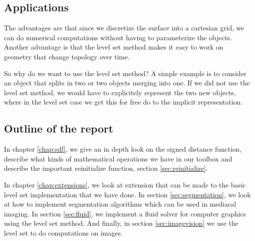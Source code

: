 \subsection{Applications}

The advantages are that since we discretize the surface into a cartesian grid, we can do numerical computations without having to parameterize the objects. Another advantage is that the level set method makes it easy to work on geometry that change topology over time.


So why do we want to use the level set method? A simple example is to consider an object that splits in two or two objects merging into one. If we did not use the level set method, we would have to explicitely represent the two new objects, where in the level set case we get this for free do to the implicit representation.


\subsection{Outline of the report}

In chapter \vref{chap:sdf}, we give an in depth look on the signed distance function, describe what kinds of mathematical operations we have in our toolbox and describe the important reinitialize function, section \vref{sec:reinitialize}.

In chapter \vref{chap:extensions}, we look at extension that can be made to the basic level set implementation that we have done. In section \vref{sec:segmentation}, we look at how to implement segmentation algorithms which can be used in mediacal imaging. In section \vref{sec:fluid}, we implement a fluid solver for computer graphics using the level set method. And finally, in section \vref{sec:imagevision} we use the level set to do computations on images.





